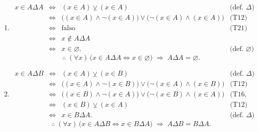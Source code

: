 \documentclass[12pt,letterpaper]{exam}
\begin{document}
\begin{enumerate}
\begin{enumerate}[label=\alph*)]
\item
\[
\begin{array}{rcll}
x\in A\Delta A
&\iff& (x\in A)\veebar(x\in A) & \text{(def.\ $\Delta$)}\\[2pt]
&\iff& \big((x\in A)\land\neg(x\in A)\big)\lor\big(\neg(x\in A)\land(x\in A)\big) & \text{(T12)}\\[2pt]
&\iff& \text{falso} & \text{(T21)}\\[2pt]
&\iff& x\notin A\Delta A\\[2pt]
&\iff& x\in\varnothing. & \text{(def.\ $\varnothing$)}
\end{array}
\]
\[
\therefore\; (\forall x)\,\big(x\in A\Delta A \iff x\in \varnothing\big)
\;\Rightarrow\; A\Delta A = \varnothing.
\]

\item
\[
\begin{array}{rcll}
x\in A\Delta B
&\iff&(x\in A)\veebar(x\in B) & \text{(def.\ $\Delta$)}\\[2pt]
&\iff& \big((x\in A)\land\neg(x\in B)\big)\lor\big(\neg(x\in A)\land(x\in B)\big) & \text{(T12)}\\[2pt]
&\iff& \big((x\in B)\land\neg(x\in A)\big)\lor\big(\neg(x\in B)\land(x\in A)\big) & \text{(T16, T2)}\\[2pt]
&\iff& (x\in B)\veebar(x\in A) & \text{(T12)}\\[2pt]
&\iff& x\in B\Delta A. & \text{(def.\ $\Delta$)}
\end{array}
\]
\[
\therefore\; (\forall x)\,\big(x\in A\Delta B \iff x\in B\Delta A\big)
\;\Rightarrow\; A\Delta B = B\Delta A.
\]


\end{enumerate}
\end{enumerate}
\end{document}
